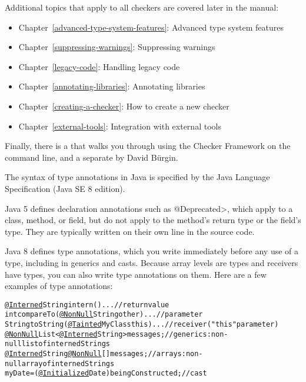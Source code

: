 Additional topics that apply to all checkers are covered later in the manual:
\begin{itemize}
\item Chapter~\ref{advanced-type-system-features}: Advanced type system features
\item Chapter~\ref{suppressing-warnings}: Suppressing warnings
\item Chapter~\ref{legacy-code}: Handling legacy code
\item Chapter~\ref{annotating-libraries}: Annotating libraries
\item Chapter~\ref{creating-a-checker}: How to create a new checker
\item Chapter~\ref{external-tools}: Integration with external tools
\end{itemize}


Finally, there is a
that walks you through using the Checker Framework on the
command line, and a separate
 by David B\"urgin.




The syntax of type annotations in Java is specified by
the Java Language Specification (Java SE 8 edition).

Java 5 defines declaration annotations such as \<@Deprecated>, which apply
to a class, method, or field, but do not apply to the method's return type
or the field's type.  They are typically written on their own line in the
source code.

Java 8 defines type annotations, which you write immediately before any
use of a type, including in generics and casts.  Because array levels are
types and receivers have types, you can also write type annotations on
them.  Here are a few examples of type annotations:

\begin{smaller}
\begin{alltt}
  \underline{@Interned} String intern() \ttlcb{} ... \ttrcb{}               // return value
  int compareTo(\underline{@NonNull} String other) \ttlcb{} ... \ttrcb{}    // parameter
  String toString(\underline{@Tainted} MyClass this) \ttlcb{} ... \ttrcb{}  // receiver ("this" parameter)
  \underline{@NonNull} List<\underline{@Interned} String> messages;       // generics:  non-null list of interned Strings
  \underline{@Interned} String \underline{@NonNull} [] messages;          // arrays:  non-null array of interned Strings
  myDate = (\underline{@Initialized} Date) beingConstructed;  // cast
\end{alltt}
\end{smaller}

